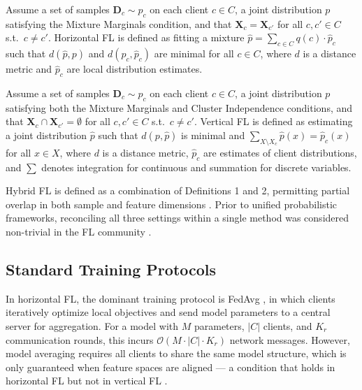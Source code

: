 
\begin{definition}
Assume a set of samples $\mathbf{D}_c \sim p_c$ on each client $c \in C$, a joint distribution $p$ satisfying the Mixture Marginals condition, and that $\mathbf{X}_c = \mathbf{X}_{c'}$ for all $c, c' \in C$ s.t.\ $c \neq c'$. Horizontal FL is defined as fitting a mixture $\hat{p} = \sum_{c \in C} q(c) \cdot \hat{p}_c$ such that $d(\hat{p}, p)$ and $d(p_c, \hat{p}_c)$ are minimal for all $c \in C$, where $d$ is a distance metric and $\hat{p}_c$ are local distribution estimates.
\end{definition}

\begin{definition}
Assume a set of samples $\mathbf{D}_c \sim p_c$ on each client $c \in C$, a joint distribution $p$ satisfying both the Mixture Marginals and Cluster Independence conditions, and that $\mathbf{X}_c \cap \mathbf{X}_{c'} = \emptyset$ for all $c, c' \in C$ s.t.\ $c \neq c'$. Vertical FL is defined as estimating a joint distribution $\hat{p}$ such that $d(p, \hat{p})$ is minimal and $\sum_{X \setminus X_c} \hat{p}(x) = \hat{p}_c(x)$ for all $x \in X$, where $d$ is a distance metric, $\hat{p}_c$ are estimates of client distributions, and $\sum$ denotes integration for continuous and summation for discrete variables.
\end{definition}

Hybrid FL is defined as a combination of Definitions 1 and 2, permitting partial overlap in both sample and feature dimensions \cite{Wen2022ASO}. Prior to unified probabilistic frameworks, reconciling all three settings within a single method was considered non-trivial in the FL community \cite{ChaveroDiez2026FederatedLF, Seng2025ScalingPC}.

\subsection*{Standard Training Protocols}

In horizontal FL, the dominant training protocol is FedAvg \cite{McMahan2016CommunicationEfficientLO}, in which clients iteratively optimize local objectives and send model parameters to a central server for aggregation. For a model with $M$ parameters, $|C|$ clients, and $K_r$ communication rounds, this incurs $\mathcal{O}(M \cdot |C| \cdot K_r)$ network messages. However, model averaging requires all clients to share the same model structure, which is only guaranteed when feature spaces are aligned — a condition that holds in horizontal FL but not in vertical FL \cite{Seng2025ScalingPC}.

